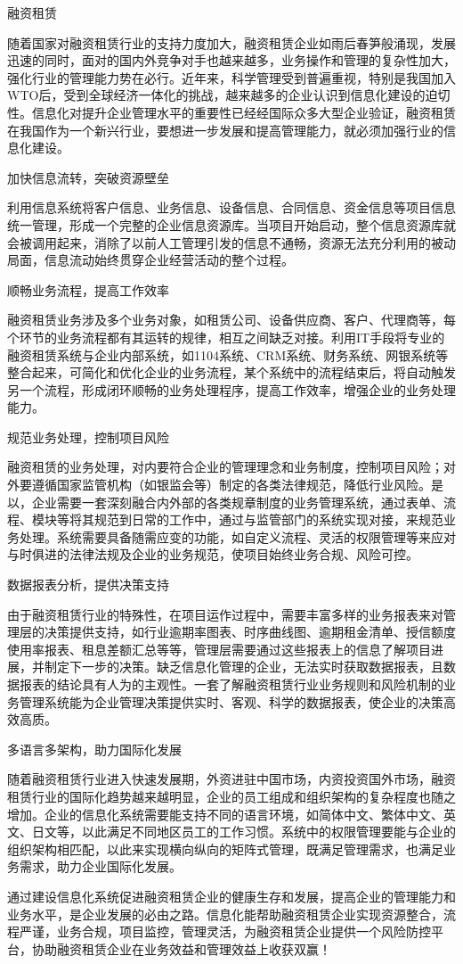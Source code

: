 融资租赁

    随着国家对融资租赁行业的支持力度加大，融资租赁企业如雨后春笋般涌现，发展迅速的同时，面对的国内外竞争对手也越来越多，业务操作和管理的复杂性加大，强化行业的管理能力势在必行。近年来，科学管理受到普遍重视，特别是我国加入WTO后，受到全球经济一体化的挑战，越来越多的企业认识到信息化建设的迫切性。信息化对提升企业管理水平的重要性已经经国际众多大型企业验证，融资租赁在我国作为一个新兴行业，要想进一步发展和提高管理能力，就必须加强行业的信息化建设。

     加快信息流转，突破资源壁垒

    利用信息系统将客户信息、业务信息、设备信息、合同信息、资金信息等项目信息统一管理，形成一个完整的企业信息资源库。当项目开始启动，整个信息资源库就会被调用起来，消除了以前人工管理引发的信息不通畅，资源无法充分利用的被动局面，信息流动始终贯穿企业经营活动的整个过程。

    顺畅业务流程，提高工作效率

    融资租赁业务涉及多个业务对象，如租赁公司、设备供应商、客户、代理商等，每个环节的业务流程都有其运转的规律，相互之间缺乏对接。利用IT手段将专业的融资租赁系统与企业内部系统，如1104系统、CRM系统、财务系统、网银系统等整合起来，可简化和优化企业的业务流程，某个系统中的流程结束后，将自动触发另一个流程，形成闭环顺畅的业务处理程序，提高工作效率，增强企业的业务处理能力。

    规范业务处理，控制项目风险

    融资租赁的业务处理，对内要符合企业的管理理念和业务制度，控制项目风险；对外要遵循国家监管机构（如银监会等）制定的各类法律规范，降低行业风险。是以，企业需要一套深刻融合内外部的各类规章制度的业务管理系统，通过表单、流程、模块等将其规范到日常的工作中，通过与监管部门的系统实现对接，来规范业务处理。系统需要具备随需应变的功能，如自定义流程、灵活的权限管理等来应对与时俱进的法律法规及企业的业务规范，使项目始终业务合规、风险可控。

     数据报表分析，提供决策支持

    由于融资租赁行业的特殊性，在项目运作过程中，需要丰富多样的业务报表来对管理层的决策提供支持，如行业逾期率图表、时序曲线图、逾期租金清单、授信额度使用率报表、租息差额汇总等等，管理层需要通过这些报表上的信息了解项目进展，并制定下一步的决策。缺乏信息化管理的企业，无法实时获取数据报表，且数据报表的结论具有人为的主观性。一套了解融资租赁行业业务规则和风险机制的业务管理系统能为企业管理决策提供实时、客观、科学的数据报表，使企业的决策高效高质。

    多语言多架构，助力国际化发展

    随着融资租赁行业进入快速发展期，外资进驻中国市场，内资投资国外市场，融资租赁行业的国际化趋势越来越明显，企业的员工组成和组织架构的复杂程度也随之增加。企业的信息化系统需要能支持不同的语言环境，如简体中文、繁体中文、英文、日文等，以此满足不同地区员工的工作习惯。系统中的权限管理要能与企业的组织架构相匹配，以此来实现横向纵向的矩阵式管理，既满足管理需求，也满足业务需求，助力企业国际化发展。

    通过建设信息化系统促进融资租赁企业的健康生存和发展，提高企业的管理能力和业务水平，是企业发展的必由之路。信息化能帮助融资租赁企业实现资源整合，流程严谨，业务合规，项目监控，管理灵活，为融资租赁企业提供一个风险防控平台，协助融资租赁企业在业务效益和管理效益上收获双赢！
